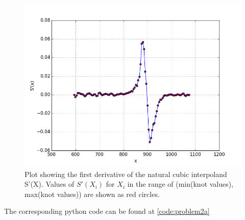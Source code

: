 \documentclass[a4paper,11pt]{article}
\begin{document}
\begin{figure}[ht]
	\center
    \includegraphics[scale=0.75]{plotS_dash.png}
    \caption{Plot showing the first derivative of the natural cubic interpoland S'(X). Values of $S'(X_i)$ for $X_i$ in the range of (min(knot values), max(knot values)) are shown as red circles.} 
	\label{fig:sdash}
\end{figure}


The corresponding python code can be found at \ref{code:problem2a}
\end{document}
